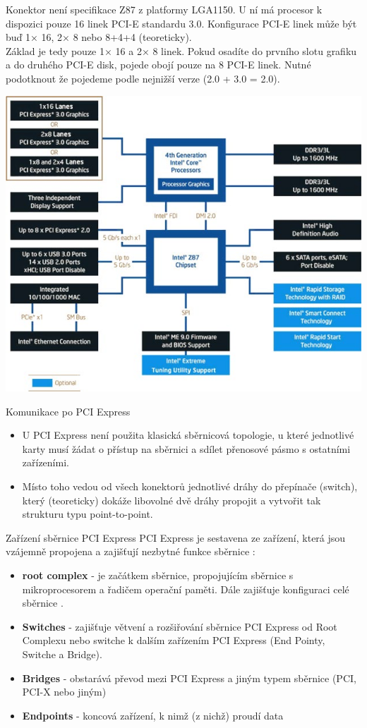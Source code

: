 \documentclass[aspectratio=43]{beamer}
\begin{document}
\begin{frame}{Konektor není specifikace}
	Z87 z platformy LGA1150. U ní má procesor k dispozici pouze 16 linek PCI-E standardu 3.0. Konfigurace PCI-E linek může být buď 1× 16, 2× 8 nebo 8+4+4 (teoreticky).\\
	Základ je tedy pouze 1× 16 a 2× 8 linek. Pokud osadíte do prvního
	slotu grafiku a do druhého PCI-E disk, pojede obojí pouze na 8 PCI-E linek. Nutné podotknout že pojedeme podle nejnižší verze (2.0 + 3.0 = 2.0).
	
	\begin{center}
		\includegraphics[width=0.5\linewidth]{extrahovane_obrazky/img_2_page26_0.jpeg}
	\end{center}
	
\end{frame}



\begin{frame}{Komunikace po PCI Express}
	\begin{itemize}
		\item U PCI Express není použita klasická sběrnicová topologie, u které jednotlivé karty musí žádat o přístup na sběrnici a sdílet přenosové pásmo s ostatními zařízeními.
		\item Místo toho vedou od všech konektorů jednotlivé dráhy do přepínače (switch), který (teoreticky) dokáže libovolné dvě dráhy propojit a vytvořit tak strukturu typu point-to-point.
	\end{itemize}
	
\end{frame}


\begin{frame}{Zařízení sběrnice PCI Express}
	PCI Express je sestavena ze zařízení, která jsou vzájemně propojena a zajišťují nezbytné funkce sběrnice :
	\begin{itemize}
		\item \textbf{root complex} - je začátkem sběrnice, propojujícím sběrnice s mikroprocesorem a řadičem operační paměti. Dále zajišťuje konfiguraci celé sběrnice .
		\item \textbf{Switches} - zajišťuje větvení a rozšiřování sběrnice PCI Express od Root Complexu nebo switche k dalším zařízením PCI Express (End Pointy, Switche a Bridge).
		\item \textbf{Bridges} - obstarává převod mezi PCI Express a jiným typem sběrnice (PCI, PCI-X nebo jiným)
		\item \textbf{Endpoints} - koncová zařízení, k nimž (z nichž) proudí data
	\end{itemize}
	
\end{frame}
\end{document}
